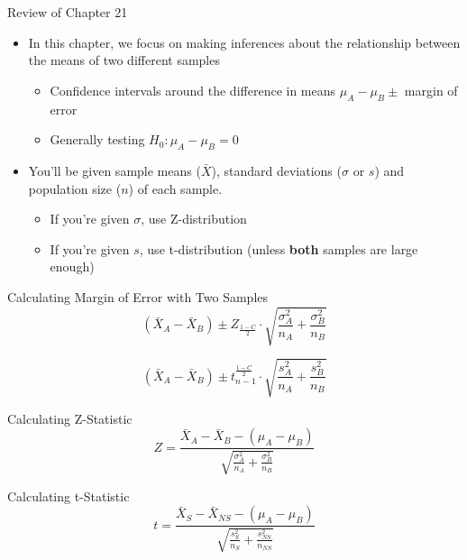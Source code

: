 \documentclass{beamer}
\begin{document}
\begin{frame}{Review of Chapter 21}
	
	\begin{itemize}
		\item In this chapter, we focus on making inferences about the relationship between the means of two different samples
		      
			\begin{itemize}
		      	\item Confidence intervals around the difference in means $\mu_A - \mu_B \pm $ margin of error
		      	      
		      	\item Generally testing $H_0: \mu_A-\mu_B = 0$
			\end{itemize}
		      
		\item You'll be given sample means ($\bar{X}$), standard deviations ($\sigma$ or $s$) and population size ($n$) of each sample. 
			\begin{itemize}
		      	
		      	\item If you're given $\sigma$, use Z-distribution
		      	
		      	\item If you're given $s$, use t-distribution (unless \textbf{both} samples are large enough)
			\end{itemize}
	\end{itemize}
	
\end{frame}

\begin{frame}{Calculating Margin of Error with Two Samples}
	\[ 
		(\bar{X}_A-\bar{X}_B) \pm Z_{\frac{1-C}{2}} \cdot \sqrt{\frac{\sigma^2_A}{n_A}+\frac{\sigma^2_B}{n_B}}
	\]
	
	\[ 
		(\bar{X}_A-\bar{X}_B) \pm t_{n-1}^{\frac{1-C}{2}} \cdot \sqrt{\frac{s^2_A}{n_A}+\frac{s^2_B}{n_B}}
	\]
\end{frame}

\begin{frame}{Calculating Z-Statistic}
	\[ 
		Z = \frac{\bar{X}_A-\bar{X}_B-(\mu_A-\mu_B)}{\sqrt{\frac{\sigma_A^2}{n_A} + \frac{\sigma_B^2}{n_B}}} 
	\]
\end{frame}

\begin{frame}{Calculating t-Statistic}
	\[ 
		t = \frac{\bar{X}_S-\bar{X}_{NS}-(\mu_A-\mu_B)}{\sqrt{\frac{s^2_S}{n_S}+\frac{s^2_{NS}}{n_{NS}}}}
	\]
\end{frame}
\end{document}
